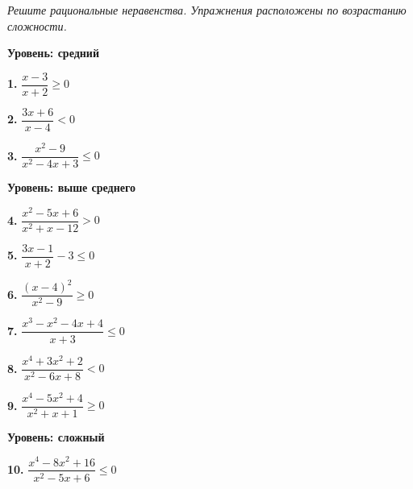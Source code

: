\documentclass[a4paper,12pt]{article}
\begin{document}
\noindent\textit{Решите рациональные неравенства. Упражнения расположены по возрастанию сложности.}

\vspace{0.4cm}

\noindent\textbf{Уровень: средний}

\vspace{0.2cm}

\noindent\textbf{1.}\quad
$\dfrac{x-3}{x+2} \ge 0$

\vspace{0.3cm}

\noindent\textbf{2.}\quad
$\dfrac{3x+6}{x-4} < 0$

\vspace{0.3cm}

\noindent\textbf{3.}\quad
$\dfrac{x^2-9}{x^2-4x+3} \le 0$

\vspace{0.5cm}

\noindent\textbf{Уровень: выше среднего}

\vspace{0.2cm}

\noindent\textbf{4.}\quad
$\dfrac{x^2-5x+6}{x^2+x-12} > 0$

\vspace{0.3cm}

\noindent\textbf{5.}\quad
$\dfrac{3x-1}{x+2} - 3 \le 0$

\vspace{0.3cm}

\noindent\textbf{6.}\quad
$\dfrac{(x-4)^2}{x^2-9} \ge 0$

\vspace{0.3cm}

\noindent\textbf{7.}\quad
$\dfrac{x^3-x^2-4x+4}{x+3} \le 0$

\vspace{0.3cm}

\noindent\textbf{8.}\quad
$\dfrac{x^4+3x^2+2}{x^2-6x+8} < 0$

\vspace{0.3cm}

\noindent\textbf{9.}\quad
$\dfrac{x^4-5x^2+4}{x^2+x+1} \ge 0$

\vspace{0.5cm}

\noindent\textbf{Уровень: сложный}

\vspace{0.2cm}

\noindent\textbf{10.}\quad
$\dfrac{x^4-8x^2+16}{x^2-5x+6} \le 0$
\end{document}
